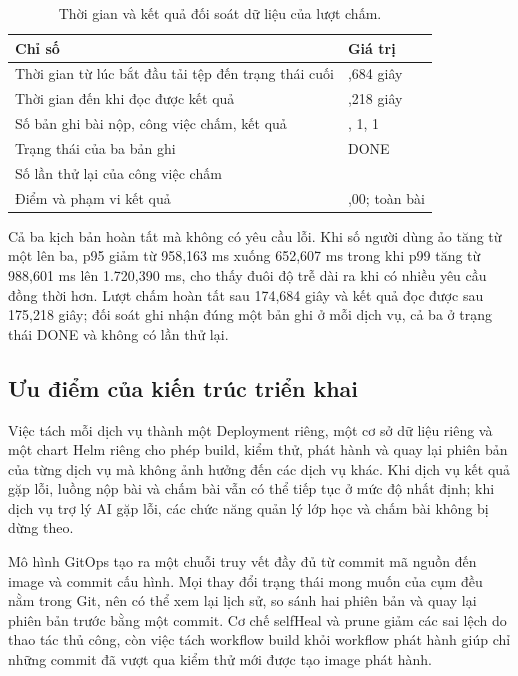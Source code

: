 \documentclass[../BTL.tex]{subfiles}
\begin{document}
\begin{table}[H]
\centering
\small
\begin{tabularx}{\textwidth}{|>{\raggedright\arraybackslash}p{5.6cm}|>{\raggedright\arraybackslash}X|}
\hline
Chỉ số & Giá trị \\ \hline
Thời gian từ lúc bắt đầu tải tệp đến trạng thái cuối & 174,684 giây \\ \hline
Thời gian đến khi đọc được kết quả & 175,218 giây \\ \hline
Số bản ghi bài nộp, công việc chấm, kết quả & 1, 1, 1 \\ \hline
Trạng thái của ba bản ghi & DONE \\ \hline
Số lần thử lại của công việc chấm & 0 \\ \hline
Điểm và phạm vi kết quả & 5,00; toàn bài \\ \hline
\end{tabularx}
\caption{Thời gian và kết quả đối soát dữ liệu của lượt chấm.}
\label{tab:grading-data}
\end{table}
\afterpage{\flushbottom}

Cả ba kịch bản hoàn tất mà không có yêu cầu lỗi. Khi số người dùng ảo tăng từ một lên ba, p95 giảm từ 958,163 ms xuống 652,607 ms trong khi p99 tăng từ 988,601 ms lên 1.720,390 ms, cho thấy đuôi độ trễ dài ra khi có nhiều yêu cầu đồng thời hơn. Lượt chấm hoàn tất sau 174,684 giây và kết quả đọc được sau 175,218 giây; đối soát ghi nhận đúng một bản ghi ở mỗi dịch vụ, cả ba ở trạng thái DONE và không có lần thử lại.

\subsection{Ưu điểm của kiến trúc triển khai}
\label{section:3.2.3}

Việc tách mỗi dịch vụ thành một Deployment riêng, một cơ sở dữ liệu riêng và một chart Helm riêng cho phép build, kiểm thử, phát hành và quay lại phiên bản của từng dịch vụ mà không ảnh hưởng đến các dịch vụ khác. Khi dịch vụ kết quả gặp lỗi, luồng nộp bài và chấm bài vẫn có thể tiếp tục ở mức độ nhất định; khi dịch vụ trợ lý AI gặp lỗi, các chức năng quản lý lớp học và chấm bài không bị dừng theo.

Mô hình GitOps tạo ra một chuỗi truy vết đầy đủ từ commit mã nguồn đến image và commit cấu hình. Mọi thay đổi trạng thái mong muốn của cụm đều nằm trong Git, nên có thể xem lại lịch sử, so sánh hai phiên bản và quay lại phiên bản trước bằng một commit. Cơ chế selfHeal và prune giảm các sai lệch do thao tác thủ công, còn việc tách workflow build khỏi workflow phát hành giúp chỉ những commit đã vượt qua kiểm thử mới được tạo image phát hành.
\end{document}
